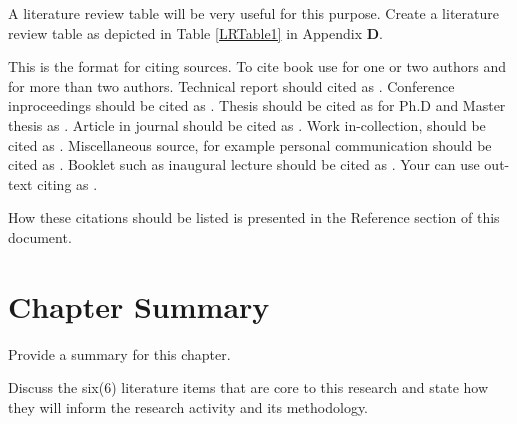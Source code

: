 A literature review table will be very useful for this purpose. Create a literature review table as depicted in Table \ref{LRTable1} in Appendix \textbf{D}. 


This is the format for citing sources. 
To cite book use \cite{Hollis:1999:VBD:519964} \cite{Dreyfus92} for one or two authors and \cite{Goossens:1999:LWC:553897} for more than two authors. Technical report should cited as \cite{897367}. Conference inproceedings should be cited as \cite{Geach68,Fulga2012}. 
Thesis should be cited as \cite{Clarkson:1985:ACP:911891, Olorunfemi2018} for Ph.D and Master thesis as \cite{Dingemanse2006,Oladimaji2012}.
Article in journal should be cited as \cite{SaeediMEJ10} \cite{McCarthy07, LawalTwoness, TurningPaper1950} . Work in-collection, should be cited as  \cite{Li-2008}. Miscellaneous source, for example personal communication should be cited as \cite{Olorode2016}. Booklet such as inaugural lecture should be cited as \cite{Akiwowo:Ajobi1980}. Your can use out-text citing as \citep{McCarthy07}.

How these citations should be listed is presented in the Reference section of this document.

\section{Chapter Summary}
Provide a summary for this chapter.

Discuss the six(6) literature items that are   core to this research and state how they will inform the research activity and its methodology. 
